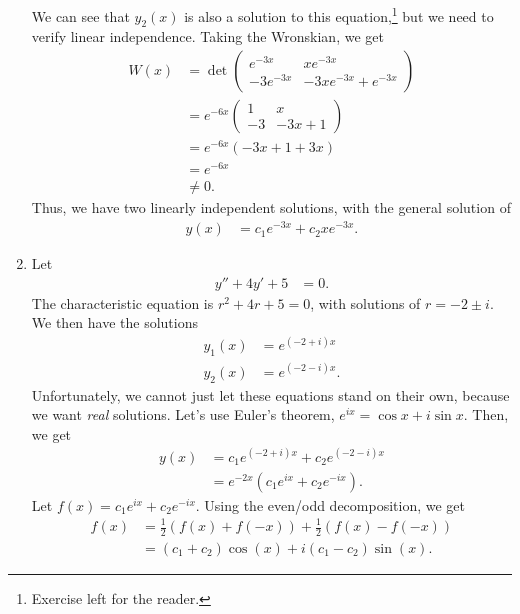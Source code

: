 \documentclass[10pt]{mypackage}
\begin{document}
\begin{example}
\begin{enumerate}[(1)]
      We can see that $y_2(x)$ is also a solution to this equation,\footnote{Exercise left for the reader.} but we need to verify linear independence. Taking the Wronskian, we get
      \begin{align*}
        W(x) &= \det \begin{pmatrix}e^{-3x} & xe^{-3x} \\ -3e^{-3x} & -3xe^{-3x} + e^{-3x}\end{pmatrix}\\
             &= e^{-6x} \begin{pmatrix}1 & x \\ -3 & -3x + 1\end{pmatrix}\\
             &= e^{-6x}\left(-3x + 1 + 3x\right)\\
             &= e^{-6x}\\
             &\neq 0.
      \end{align*}
      Thus, we have two linearly independent solutions, with the general solution of
      \begin{align*}
        y(x) &= c_1e^{-3x} + c_2xe^{-3x}.
      \end{align*}
    \item Let
      \begin{align*}
        y'' + 4y' + 5 &= 0.
      \end{align*}
      The characteristic equation is $r^2 + 4r + 5 = 0$, with solutions of $r = -2 \pm i$. We then have the solutions
      \begin{align*}
        y_1(x) &= e^{\left(-2 + i\right)x}\\
        y_2(x) &= e^{\left(-2-i\right)x}.
      \end{align*}
      Unfortunately, we cannot just let these equations stand on their own, because we want \textit{real} solutions. Let's use Euler's theorem, $e^{ix} = \cos x + i\sin x$. Then, we get
      \begin{align*}
        y(x) &= c_1e^{\left(-2+i\right)x} + c_2e^{\left(-2-i\right)x}\\
             &= e^{-2x}\left(c_1e^{ix} + c_2e^{-ix}\right).
      \end{align*}
      Let $f(x) = c_1e^{ix} + c_2e^{-ix}$. Using the even/odd decomposition, we get
      \begin{align*}
        f(x) &= \frac{1}{2}\left(f(x) + f\left(-x\right)\right) + \frac{1}{2}\left(f(x) - f\left(-x\right)\right)\\
             &= \left(c_1 + c_2\right)\cos\left(x\right) + i\left(c_1 - c_2\right)\sin\left(x\right).

\end{align*}
\end{enumerate}
\end{example}
\end{document}
